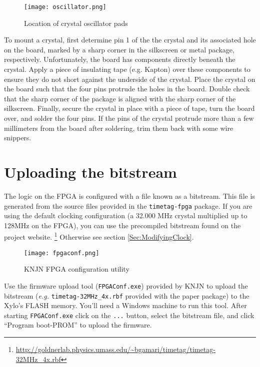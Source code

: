 \begin{figure}
  \center
  \texttt{[image: oscillator.png]}
  \caption{Location of crystal oscillator pads}
  \label{fig:crystal}
\end{figure}

To mount a crystal, first determine pin 1 of the the crystal and its
associated hole on the board, marked by a sharp corner in the
silkscreen or metal package, respectively. Unfortunately, the board
has components directly beneath the crystal. Apply a piece of
insulating tape (e.g. Kapton) over these components to ensure they do
not short against the underside of the crystal. Place the crystal on
the board such that the four pins protrude the holes in the
board. Double check that the sharp corner of the package is aligned
with the sharp corner of the silkscreen. Finally, secure the crystal
in place with a piece of tape, turn the board over, and solder the
four pins. If the pins of the crystal protrude more than a few
millimeters from the board after soldering, trim them back with some
wire snippers.

\section{Uploading the bitstream}
\label{Sec:UploadingBitstream}

The logic on the FPGA is configured with a file known as a
bitstream. This file is generated from the source files provided in
the {\tt timetag-fpga} package.  If you are using the default clocking
configuration (a 32.000 MHz crystal multiplied up to 128MHz on the
FPGA), you can use the precompiled bitstream found on the project
website.
\footnote{\url{http://goldnerlab.physics.umass.edu/~bgamari/timetag/timetag-32MHz\_4x.rbf}}
Otherwise see section \ref{Sec:ModifyingClock}.

\begin{figure}
  \center
  \texttt{[image: fpgaconf.png]}
  \caption{KNJN FPGA configuration utility}
  \label{fig:fpgaconf}
\end{figure}

Use the firmware upload tool ({\tt FPGAConf.exe}) provided by KNJN to
upload the bitstream ({\it e.g.} {\tt timetag-32MHz\_4x.rbf} provided
with the paper package) to the Xylo's FLASH memory. You'll need a
Windows machine to run this tool. After starting {\tt FPGAConf.exe}
click on the {\tt ...} button, select the bitstream file, and click
``Program boot-PROM'' to upload the firmware.


